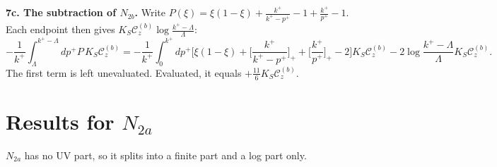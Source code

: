 \documentclass[10pt]{article}
\numberwithin{equation}{section}
\begin{document}
\textbf{7c. The subtraction of $N_{2b}$.} Write $P(\xi)=\xi(1-\xi)+\frac{k^{+}}{k^{+}-p^{+}}-1+\frac{k^{+}}{p^{+}}-1$. Each endpoint then gives $K_{S}\mathcal{C}^{(b)}_{z}\log\frac{k^{+}-\Lambda}{\Lambda}$:
\begin{equation}
-\frac{1}{k^{+}}\!\int_{\Lambda}^{k^{+}-\Lambda}\!\!dp^{+}P\,K_{S}\mathcal{C}^{(b)}_{z}=-\frac{1}{k^{+}}\!\int_{0}^{k^{+}}\!\!dp^{+}\Big[\xi(1-\xi)+\Big[\frac{k^{+}}{k^{+}-p^{+}}\Big]_{+}+\Big[\frac{k^{+}}{p^{+}}\Big]_{+}-2\Big]K_{S}\mathcal{C}^{(b)}_{z}-2\log\frac{k^{+}-\Lambda}{\Lambda}K_{S}\mathcal{C}^{(b)}_{z}.
\end{equation}
The first term is left unevaluated. Evaluated, it equals $+\frac{11}{6}K_{S}\mathcal{C}^{(b)}_{z}$.

\section{Results for $N_{2a}$}
$N_{2a}$ has no UV part, so it splits into a finite part and a log part only.
\end{document}
